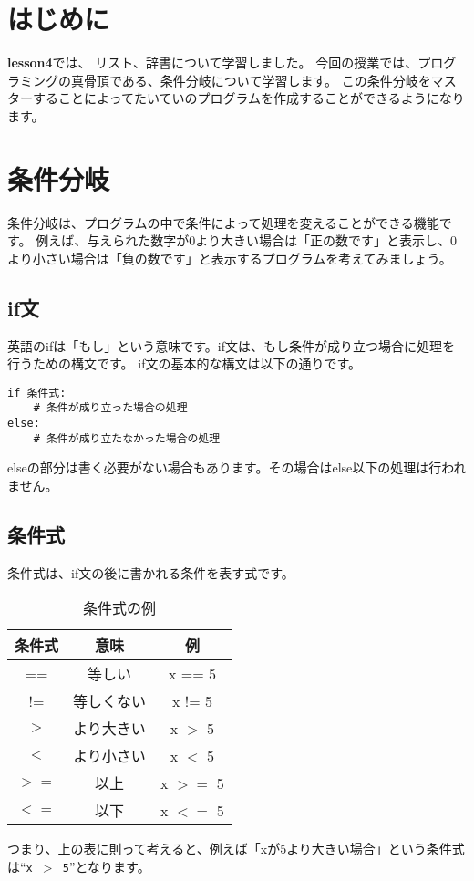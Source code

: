 \documentclass[a4paper,titlepage,dvipdfmx]{jarticle}
\begin{document}
\section{はじめに}
\textbf{lesson4}では、
リスト、辞書について学習しました。
今回の授業では、プログラミングの真骨頂である、条件分岐について学習します。
この条件分岐をマスターすることによってたいていのプログラムを作成することができるようになります。
\section{条件分岐}
条件分岐は、プログラムの中で条件によって処理を変えることができる機能です。
例えば、与えられた数字が0より大きい場合は「正の数です」と表示し、0より小さい場合は「負の数です」と表示するプログラムを考えてみましょう。

\subsection{if文}
英語のifは「もし」という意味です。if文は、もし条件が成り立つ場合に処理を行うための構文です。
if文の基本的な構文は以下の通りです。
\begin{lstlisting}[caption=if文の基本構文]
if 条件式:
    # 条件が成り立った場合の処理
else:
    # 条件が成り立たなかった場合の処理
\end{lstlisting}
elseの部分は書く必要がない場合もあります。その場合はelse以下の処理は行われません。
\subsection{条件式}
条件式は、if文の後に書かれる条件を表す式です。
\begin{table}[H]
  \centering
  \begin{tabular}{|c|c|c|} \hline
    条件式  & 意味    & 例        \\ \hline
    ==   & 等しい   & x == 5   \\
    !=   & 等しくない & x != 5   \\
    $>$  & より大きい & x $>$ 5  \\
    $<$  & より小さい & x $<$ 5  \\
    $>=$ & 以上    & x $>=$ 5 \\
    $<=$ & 以下    & x $<=$ 5 \\ \hline
  \end{tabular}
  \caption{条件式の例}
\end{table}
つまり、上の表に則って考えると、例えば「xが5より大きい場合」という条件式は``\texttt{x $>$ 5}''となります。
\end{document}
